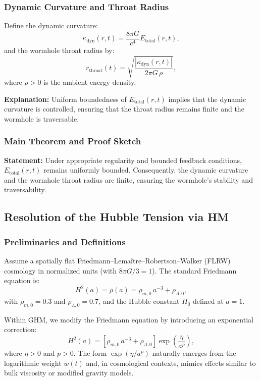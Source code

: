 \documentclass[11pt]{article}
\begin{document}
\subsubsection{Dynamic Curvature and Throat Radius}

Define the dynamic curvature:
\[
\kappa_{\mathrm{dyn}}(r,t)=\frac{8\pi G}{c^4} E_{\mathrm{total}}(r,t),
\]
and the wormhole throat radius by:
\[
r_{\mathrm{throat}}(t)=\sqrt{\frac{\left|\kappa_{\mathrm{dyn}}(r,t)\right|}{2\pi G\,\rho}},
\]
where $\rho>0$ is the ambient energy density.

\textbf{Explanation:} Uniform boundedness of $E_{\mathrm{total}}(r,t)$ implies that the dynamic curvature is controlled, ensuring that the throat radius remains finite and the wormhole is traversable.

\subsubsection{Main Theorem and Proof Sketch}

\textbf{Statement:} Under appropriate regularity and bounded feedback conditions, $E_{\mathrm{total}}(r,t)$ remains uniformly bounded. Consequently, the dynamic curvature and the wormhole throat radius are finite, ensuring the wormhole's stability and traversability.

\subsection{Resolution of the Hubble Tension via HM}

\subsubsection{Preliminaries and Definitions}

Assume a spatially flat Friedmann--Lema\^itre--Robertson--Walker (FLRW) cosmology in normalized units (with $8\pi G/3=1$). The standard Friedmann equation is:
\[
H^2(a)=\rho(a)=\rho_{m,0}\,a^{-3}+\rho_{\Lambda,0},
\]
with $\rho_{m,0}=0.3$ and $\rho_{\Lambda,0}=0.7$, and the Hubble constant $H_0$ defined at $a=1$.

Within GHM, we modify the Friedmann equation by introducing an exponential correction:
\[
H^2(a)=\left[\rho_{m,0}\,a^{-3}+\rho_{\Lambda,0}\right]\exp\left(\frac{\eta}{a^p}\right),
\]
where $\eta>0$ and $p>0$. The form $\exp(\eta/a^p)$ naturally emerges from the logarithmic weight $w(t)$ and, in cosmological contexts, mimics effects similar to bulk viscosity or modified gravity models.
\end{document}
